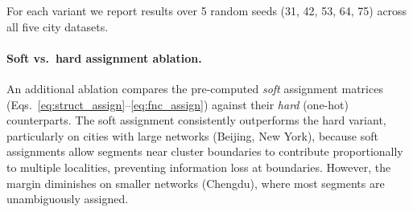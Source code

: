 \noindent
For each variant we report results over 5 random seeds (31, 42, 53, 64, 75) across all five city datasets.

\paragraph{Soft vs.\ hard assignment ablation.}
An additional ablation compares the pre-computed \emph{soft} assignment matrices (Eqs.~\ref{eq:struct_assign}--\ref{eq:fnc_assign}) against their \emph{hard} (one-hot) counterparts.
The soft assignment consistently outperforms the hard variant, particularly on cities with large networks (Beijing, New York), because soft assignments allow segments near cluster boundaries to contribute proportionally to multiple localities, preventing information loss at boundaries.
However, the margin diminishes on smaller networks (Chengdu), where most segments are unambiguously assigned.
